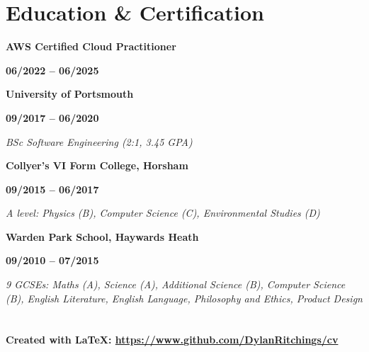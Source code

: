 \documentclass[12pt]{article}
\newcommand{\education}[3]{

  \noindent  \textbf{#1}
    \hfill 
    \parbox{9em}{%
    \centering\textbf{#2}} \par
    \vspace*{0.5em} 
     \noindent \textit{#3} \par
     \vspace*{1em}
\normalsize \par}
\begin{document}
\section*{Education \& Certification}

\education{AWS Certified Cloud Practitioner} {06/2022 -- 06/2025} {}
\education{University of Portsmouth} {09/2017 -- 06/2020} {BSc Software Engineering (2:1, 3.45 GPA)} 
\education{Collyer's VI Form College, Horsham} {09/2015 -- 06/2017} {A level: Physics (B), Computer Science (C), Environmental Studies (D)}
\education{Warden Park School, Haywards Heath} {09/2010 -- 07/2015} {9 GCSEs: Maths (A), Science (A), Additional Science (B), Computer Science (B), English Literature, English Language, Philosophy and Ethics, Product Design} 

\section*{}
\paragraph {Created with \LaTeX: \url{https://www.github.com/DylanRitchings/cv}}
\end{document}
